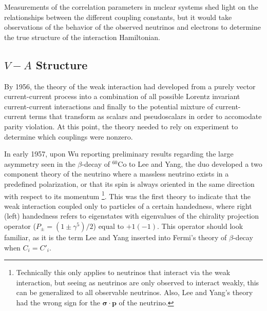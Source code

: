 Measurements of the correlation parameters in nuclear systems shed light on the
relationships between the different coupling constants, but it would take observations
of the behavior of the observed neutrinos and electrons to determine the true structure
of the interaction Hamiltonian.

\subsection{$V-A$ Structure}

By 1956, the theory of the weak interaction had developed from a purely vector current-current
process into
a combination of all possible Lorentz invariant current-current interactions and finally to the potential mixture
of current-current terms that transform as scalars and pseudoscalars in order to accomodate
parity violation. At this point, the theory needed to rely on experiment to determine
which couplings were nonzero.

In early 1957, upon Wu reporting preliminary results regarding the large asymmetry seen in the $\beta$-decay
of $^{60}\mathrm{Co}$ to Lee and Yang, the duo developed a two component theory
of the neutrino where a massless neutrino exists in a predefined polarization, or that
its spin is always oriented in the same direction with respect to its momentum \cite{lee1957}
\footnote{Technically this only applies to neutrinos that interact via
  the weak interaction, but seeing as neutrinos are only
  observed to interact weakly, this can be generalized to all observable neutrinos. Also, Lee and
  Yang's theory had the wrong sign for the $\boldsymbol{\sigma \cdot p}$ of the neutrino.}.
This was the first theory to indicate that the weak interaction coupled only to particles
of a certain handedness, where right (left) handedness refers to eigenstates with eigenvalues of the
chirality projection operator ($P_{\pm} = (1\pm \gamma^5)/2$) equal to $+1\mathrm{ }(-1)$. This operator
should look familiar, as it is the term Lee and Yang inserted into Fermi's theory of $\beta$-decay
when $C_i=C'_i$. 

